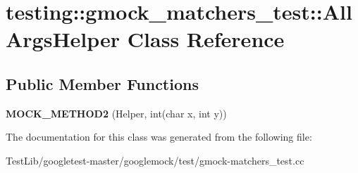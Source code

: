 \hypertarget{classtesting_1_1gmock__matchers__test_1_1AllArgsHelper}{}\section{testing\+:\+:gmock\+\_\+matchers\+\_\+test\+:\+:All\+Args\+Helper Class Reference}
\label{classtesting_1_1gmock__matchers__test_1_1AllArgsHelper}
\subsection*{Public Member Functions}
\begin{DoxyCompactItemize}
\item 
\mbox{\label{classtesting_1_1gmock__matchers__test_1_1AllArgsHelper_a571b9c1e5ab4e891085060e73c94be32}} 
{\bfseries M\+O\+C\+K\+\_\+\+M\+E\+T\+H\+O\+D2} (Helper, int(char x, int y))
\end{DoxyCompactItemize}


The documentation for this class was generated from the following file\+:\begin{DoxyCompactItemize}
\item 
Test\+Lib/googletest-\/master/googlemock/test/gmock-\/matchers\+\_\+test.\+cc\end{DoxyCompactItemize}
